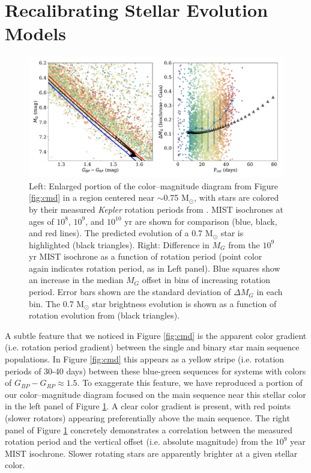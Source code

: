 \documentclass[preprint2]{aastex62}
\newcommand{\Kepler}{\textsl{Kepler}\xspace}
\begin{document}
\vspace{1in}
\section{Recalibrating Stellar Evolution Models}


\begin{figure}
\centering
\includegraphics[width=6in]{../figures/cmd_zoom}
\caption{
Left: Enlarged portion of the color--magnitude diagram from Figure \ref{fig:cmd} in a region centered near $\sim$0.75 M$_\odot$, with stars are colored by their measured \Kepler rotation periods from \citet{mcquillan2014}.
MIST isochrones at ages of $10^8$, $10^9$, and $10^{10}$ yr are shown for comparison (blue, black, and red lines). The predicted evolution of a 0.7 M$_\odot$ star is highlighted (black triangles). %
Right: Difference in $M_G$ from the $10^9$ yr MIST isochrone as a function of rotation period (point color again indicates rotation period, as in Left panel). Blue squares show an increase in the median $M_G$ offset in bins of increasing rotation period. Error bars shown are the standard deviation of $\Delta M_G$ in each bin. The 0.7 M$_\odot$ star brightness evolution is shown as a function of rotation evolution from \citet{meibom2009} (black triangles).
}
\label{fig:cmd_zoom}
\end{figure}

A subtle feature that we noticed in Figure \ref{fig:cmd} is the apparent color gradient (i.e. rotation period gradient) between the single and binary star main sequence populations. In Figure \ref{fig:cmd} this appears as a yellow stripe (i.e. rotation periods of 30-40 days) between these blue-green sequences for systems with colors of $G_{BP} - G_{RP} \approx 1.5$. To exaggerate this feature, we have reproduced a portion of our color--magnitude diagram focused on the main sequence near this stellar color in the left panel of Figure \ref{fig:cmd_zoom}. A clear color gradient is present, with red points (slower rotators) appearing preferentially above the main sequence.
The right panel of Figure \ref{fig:cmd_zoom} concretely demonstrates a correlation between the measured rotation period and the vertical offset (i.e. absolute magnitude) from the $10^9$ year MIST isochrone. Slower rotating stars are apparently brighter at a given stellar color.
\end{document}
